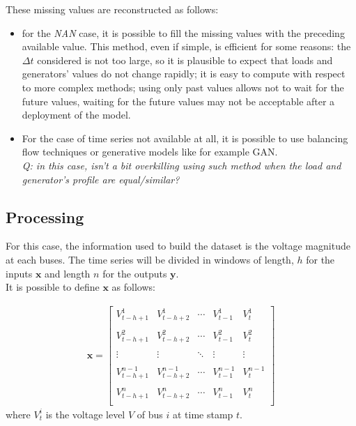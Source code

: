 \noindent These missing values are reconstructed as follows:
\begin{itemize}
    \item for the \emph{NAN} case, it is possible to fill the missing values with the preceding available value. This method, even if simple, is efficient for some reasons: the $\Delta t$ considered is not too large, so it is plausible to expect that loads and generators' values do not change rapidly; it is easy to compute with respect to more complex methods; using only past values allows not to wait for the future values, waiting for the future values may not be acceptable after a deployment of the model.
    
    \item For the case of time series not available at all, it is possible to use balancing flow techniques or generative models like for example \gls{GAN}.\\
    \emph{Q: in this case, isn't a bit overkilling using such method when the load and generator's profile are equal/similar? \label{q:gan}}
\end{itemize}

\subsection{Processing}
For this case, the information used to build the dataset is the voltage magnitude at each buses. The time series will be divided in windows of length, $h$ for the inputs $\textbf{x}$ and length $n$ for the outputs $\textbf{y}$. \\

It is possible to define $\textbf{x}$ as follows:

\begin{equation}
  \begin{aligned}
    \textbf{x}  = 
        \begin{bmatrix}
        V^1_{t-h+1} & V^1_{t-h+2} & \cdots & V^1_{t-1} & V^1_{t} \\
        & & & & \\
        
        V^2_{t-h+1} & V^2_{t-h+2} & \cdots & V^2_{t-1} & V^2_{t} \\
        & & & & \\
        
        \vdots & \vdots & \ddots & \vdots & \vdots \\
        & & & & \\
        
        V^{n-1}_{t-h+1} & V^{n-1}_{t-h+2} & \cdots & V^{n-1}_{t-1} & V^{n-1}_{t} \\
        & & & & \\
        
        V^n_{t-h+1} & V^n_{t-h+2} & \cdots & V^n_{t-1} & V^n_{t} \\
        \end{bmatrix}
  \end{aligned}
\end{equation}
\noindent where $V^i_t$ is the voltage level $V$ of bus $i$ at time stamp $t$. \\

